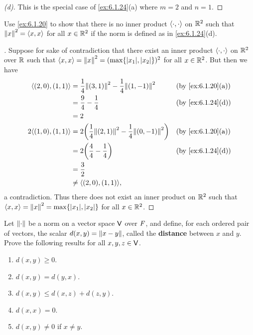 \begin{proof}[(d)]
  This is the special case of \cref{ex:6.1.24}(a) where \(m = 2\) and \(n = 1\).
\end{proof}

\begin{ex}\label{ex:6.1.25}
  Use \cref{ex:6.1.20} to show that there is no inner product \(\left\langle\cdot, \cdot\right\rangle\) on \(\mathbb{R}^2\) such that \(\left\lVert x\right\rVert^2 = \left\langle x, x\right\rangle\) for all \(x \in \mathbb{R}^2\) if the norm is defined as in \cref{ex:6.1.24}(d).
\end{ex}

\begin{proof}[]
  Suppose for sake of contradiction that there exist an inner product \(\left\langle\cdot, \cdot\right\rangle\) on \(\mathbb{R}^2\) over \(\mathbb{R}\) such that \(\inn{x, x} = \norm{x}^2 = (\max\set{\abs{x_1}, \abs{x_2}})^2\) for all \(x \in \mathbb{R}^2\).
  But then we have
  \begin{align*}
    \inn{(2, 0), (1, 1)}   & = \frac{1}{4} \norm{(3, 1)}^2 - \frac{1}{4} \norm{(1, -1)}^2        &  & \text{(by \cref{ex:6.1.20}(a))} \\
                           & = \frac{9}{4} - \frac{1}{4}                                         &  & \text{(by \cref{ex:6.1.24}(d))} \\
                           & = 2                                                                                                      \\
    2 \inn{(1, 0), (1, 1)} & = 2 \pa{\frac{1}{4} \norm{(2, 1)}^2 - \frac{1}{4} \norm{(0, -1)}^2} &  & \text{(by \cref{ex:6.1.20}(a))} \\
                           & = 2 \pa{\frac{4}{4} - \frac{1}{4}}                                  &  & \text{(by \cref{ex:6.1.24}(d))} \\
                           & = \frac{3}{2}                                                                                            \\
                           & \neq \inn{(2, 0), (1, 1)},
  \end{align*}
  a contradiction.
  Thus there does not exist an inner product on \(\mathbb{R}^2\) such that \(\inn{x, x} = \norm{x}^2 = \max\set{\abs{x_1}, \abs{x_2}}\) for all \(x \in \mathbb{R}^2\).
\end{proof}

\begin{ex}\label{ex:6.1.26}
  Let \(\left\lVert\cdot\right\rVert\) be a norm on a vector space \(\mathsf{V}\) over \(\mathit{F}\), and define, for each ordered pair of vectors, the scalar \(d(x, y) = \left\lVert x - y\right\rVert\), called the \textbf{distance} between \(x\) and \(y\).
  Prove the following results for all \(x, y, z \in \mathsf{V}\).
  \begin{enumerate}
    \item \(d(x, y) \geq 0\).
    \item \(d(x, y) = d(y, x)\).
    \item \(d(x, y) \leq d(x, z) + d(z, y)\).
    \item \(d(x, x) = 0\).
    \item \(d(x, y) \neq 0\) if \(x \neq y\).
  \end{enumerate}
\end{ex}

